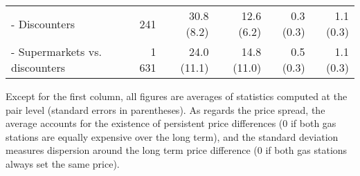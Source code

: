 \documentclass[english]{article}
\begin{document}
\begin{table}[H]
\begin{threeparttable}
\begin{tabular}{lrrrrr}
    \hspace*{4mm} - Discounters & 241   & 30.8 \phantom{0}(8.2) & 12.6 \phantom{0}(6.2) & 0.3 (0.3) & 1.1 (0.3) \\
    \hspace*{4mm} - Supermarkets vs. discounters & 1 631 & 24.0 (11.1) & 14.8 (11.0) & 0.5 (0.3) & 1.1 (0.3) \\
    \bottomrule
    \bottomrule
\end{tabular}
\begin{tablenotes}
			\small
      \item Except for the first column, all figures are averages of statistics computed at the pair level (standard errors in parentheses). As regards the price spread, the average accounts for the existence of persistent price differences (0 if both gas stations are equally expensive over the long term), and the standard deviation measures dispersion around the long term price difference (0 if both gas stations always set the same price).
\end{tablenotes}
\end{threeparttable}
\end{table}
\end{document}
